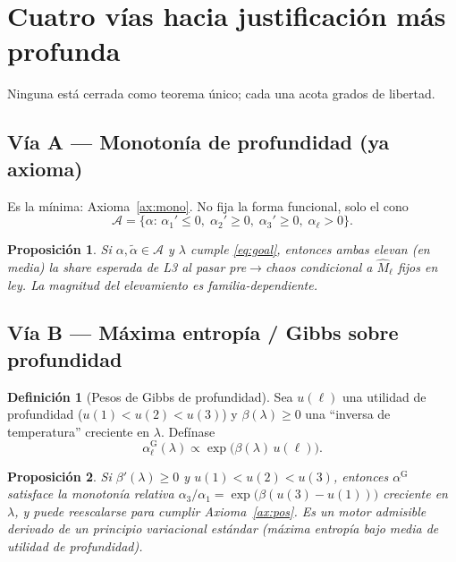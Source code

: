 \documentclass[11pt,a4paper]{article}
\theoremstyle{definition}
\newtheorem{definition}{Definici\'on}[section]
\theoremstyle{plain}
\newtheorem{proposition}{Proposici\'on}[section]
\theoremstyle{remark}
\begin{document}
\section{Cuatro v\'ias hacia justificación m\'as profunda}
\label{sec:vias}

Ninguna est\'a cerrada como teorema \'unico; cada una acota grados de
libertad.

\subsection{V\'ia A --- Monoton\'ia de profundidad (ya axioma)}

Es la m\'inima: Axioma~\ref{ax:mono}. No fija la forma funcional, solo el
cono
\[
\mathcal{A}
=\bigl\{\alpha:\,
\alpha_1'\le 0,\;
\alpha_2'\ge 0,\;
\alpha_3'\ge 0,\;
\alpha_\ell>0\bigr\}.
\]

\begin{proposition}
\label{prop:cone}
Si $\alpha,\tilde\alpha\in\mathcal{A}$ y $\lambda$ cumple
\eqref{eq:goal}, entonces ambas elevan (en media) la share esperada de
L3 al pasar pre$\to$chaos \emph{condicional} a $\widehat{M}_\ell$ fijos en
ley. La magnitud del elevamiento es familia-dependiente.
\end{proposition}

\subsection{V\'ia B --- M\'axima entrop\'ia / Gibbs sobre profundidad}

\begin{definition}[Pesos de Gibbs de profundidad]
\label{def:gibbs}
Sea $u(\ell)$ una utilidad de profundidad ($u(1)<u(2)<u(3)$) y
$\beta(\lambda)\ge 0$ una ``inversa de temperatura'' creciente en
$\lambda$. Def\'inase
\begin{equation}
\label{eq:gibbs}
\alpha_\ell^{\mathrm{G}}(\lambda)
\propto
\exp\bigl(\beta(\lambda)\,u(\ell)\bigr).
\end{equation}
\end{definition}

\begin{proposition}
\label{prop:gibbs_adm}
Si $\beta'(\lambda)\ge 0$ y $u(1)<u(2)<u(3)$, entonces
$\alpha^{\mathrm{G}}$ satisface la monoton\'ia relativa
$\alpha_3/\alpha_1=\exp\bigl(\beta(u(3)-u(1))\bigr)$ creciente en
$\lambda$, y puede reescalarse para cumplir Axioma~\ref{ax:pos}.
Es un motor admisible \emph{derivado} de un principio variacional
est\'andar (m\'axima entrop\'ia bajo media de utilidad de profundidad).
\end{proposition}
\end{document}
